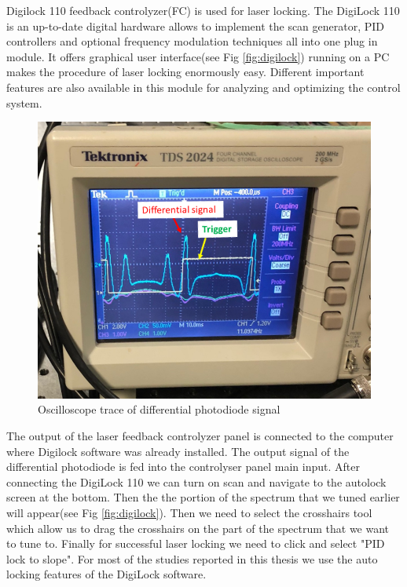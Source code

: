 Digilock 110 feedback controlyzer(FC) is used for laser locking. The DigiLock 110 is an up-to-date digital hardware allows to implement the scan generator, PID controllers and optional frequency modulation techniques all into one plug in module. It offers graphical user interface(see Fig \ref{fig:digilock}) running on a PC makes the procedure of laser locking enormously easy. Different important features are also available in this module for analyzing and optimizing the control system.
 \begin{figure}[h]
\centering
\includegraphics[width=0.7\linewidth]{figures/laser tune.png}
\caption{Oscilloscope trace of differential photodiode signal \label{fig:laser tune}}
\end{figure}
The output of the laser feedback controlyzer panel is connected to the computer where Digilock software was already installed. The output signal of the differential photodiode is fed into the controlyser panel main input. After connecting the DigiLock 110 we can turn on scan and navigate to the autolock screen at the bottom. Then the the portion of the spectrum that we tuned earlier will appear(see Fig \ref{fig:digilock}). Then we need to select the crosshairs tool which allow us to drag the crosshairs on the part of the spectrum that we want to tune to. Finally for successful laser locking we need to click and select "PID lock to slope". For most of the studies reported in this thesis we use the auto locking features of the DigiLock software.

